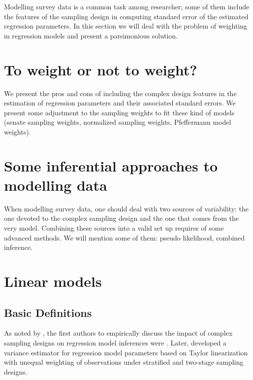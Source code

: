 \documentclass[
  12pt,
]{book}
\begin{document}
Modelling survey data is a common task among researcher; some of them include the features of the sampling design in computing standard error of the estimated regression parameters. In this section we will deal with the problem of weighting in regression models and present a parsimonious solution.

\hypertarget{to-weight-or-not-to-weight}{%
\section{To weight or not to weight?}\label{to-weight-or-not-to-weight}}

We present the pros and cons of including the complex design features in the estimation of regression parameters and their associated standard errors. We present some adjustment to the sampling weights to fit these kind of models (senate sampling weights, normalized sampling weights, Pfeffermann model weights).

\hypertarget{some-inferential-approaches-to-modelling-data}{%
\section{Some inferential approaches to modelling data}\label{some-inferential-approaches-to-modelling-data}}

When modelling survey data, one should deal with two sources of variability: the one devoted to the complex sampling design and the one that comes from the very model. Combining these sources into a valid set up requires of some advanced methods. We will mention some of them: pseudo likelihood, combined inference.

\hypertarget{linear-models}{%
\section{Linear models}\label{linear-models}}

\hypertarget{basic-definitions}{%
\subsection{Basic Definitions}\label{basic-definitions}}

As noted by \citet{Heeringa_West_Berglund_2017}, the first authors to empirically discuss the impact of complex sampling designs on regression model inferences were \citet{kish1974inference}. Later, \citet{fuller1975regression} developed a variance estimator for regression model parameters based on Taylor linearization with unequal weighting of observations under stratified and two-stage sampling designs.
\end{document}
